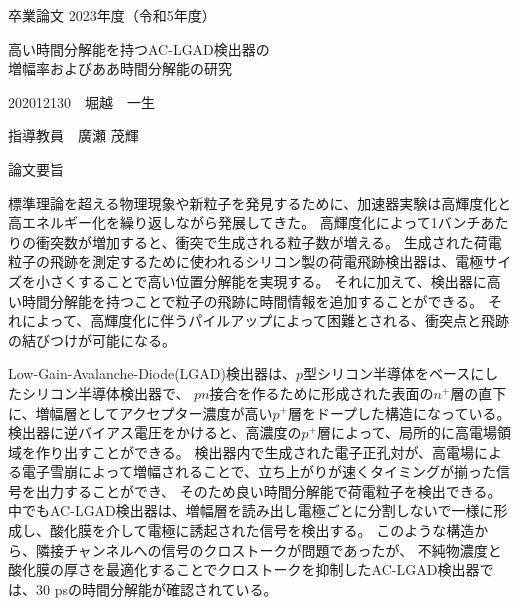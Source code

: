 \begin{center}
  {\Large 卒業論文 2023年度（令和5年度）}

  {\LARGE 高い時間分解能を持つAC-LGAD検出器の\\増幅率およびああ時間分解能の研究}
\end{center}

\quad

\begin{flushright}
    202012130　堀越　一生

    指導教員　廣瀬 茂輝
\end{flushright}

\quad

{\large \gt 論文要旨}

  標準理論を超える物理現象や新粒子を発見するために、加速器実験は高輝度化と高エネルギー化を繰り返しながら発展してきた。
  高輝度化によって1バンチあたりの衝突数が増加すると、衝突で生成される粒子数が増える。
  生成された荷電粒子の飛跡を測定するために使われるシリコン製の荷電飛跡検出器は、電極サイズを小さくすることで高い位置分解能を実現する。
  それに加えて、検出器に高い時間分解能を持つことで粒子の飛跡に時間情報を追加することができる。
  それによって、高輝度化に伴うパイルアップによって困難とされる、衝突点と飛跡の結びつけが可能になる。
  
  Low-Gain-Avalanche-Diode(LGAD)検出器は、$p$型シリコン半導体をベースにしたシリコン半導体検出器で、
  $pn$接合を作るために形成された表面の$n^+$層の直下に、増幅層としてアクセプター濃度が高い$p^+$層をドープした構造になっている。
  検出器に逆バイアス電圧をかけると、高濃度の$p^+$層によって、局所的に高電場領域を作り出すことができる。
  検出器内で生成された電子正孔対が、高電場による電子雪崩によって増幅されることで、立ち上がりが速くタイミングが揃った信号を出力することができ、
  そのため良い時間分解能で荷電粒子を検出できる。
  中でもAC-LGAD検出器は、増幅層を読み出し電極ごとに分割しないで一様に形成し、酸化膜を介して電極に誘起された信号を検出する。
  このような構造から、隣接チャンネルへの信号のクロストークが問題であったが、
  不純物濃度と酸化膜の厚さを最適化することでクロストークを抑制したAC-LGAD検出器では、30 psの時間分解能が確認されている。
  
  
